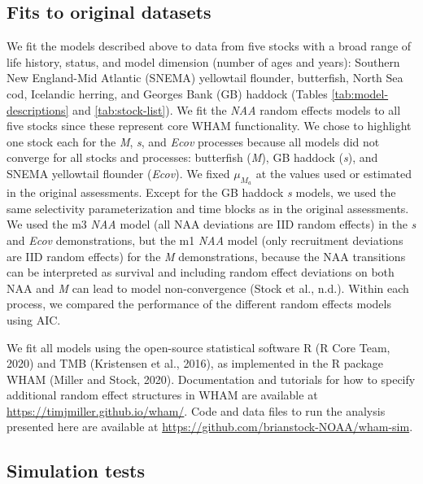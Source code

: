 \documentclass[]{article}
\begin{document}
\hypertarget{fits-to-original-datasets}{%
\subsection{Fits to original datasets}\label{fits-to-original-datasets}}

We fit the models described above to data from five stocks with a broad
range of life history, status, and model dimension (number of ages and
years): Southern New England-Mid Atlantic (SNEMA) yellowtail flounder,
butterfish, North Sea cod, Icelandic herring, and Georges Bank (GB)
haddock (Tables \ref{tab:model-descriptions} and \ref{tab:stock-list}).
We fit the \emph{NAA} random effects models to all five stocks since
these represent core WHAM functionality. We chose to highlight one stock
each for the \emph{M}, \emph{s}, and \emph{Ecov} processes because all
models did not converge for all stocks and processes: butterfish
(\emph{M}), GB haddock (\emph{s}), and SNEMA yellowtail flounder
(\emph{Ecov}). We fixed \(\mu_{M_a}\) at the values used or estimated in
the original assessments. Except for the GB haddock \emph{s} models, we
used the same selectivity parameterization and time blocks as in the
original assessments. We used the m3 \emph{NAA} model (all NAA
deviations are IID random effects) in the \emph{s} and \emph{Ecov}
demonstrations, but the m1 \emph{NAA} model (only recruitment deviations
are IID random effects) for the \emph{M} demonstrations, because the NAA
transitions can be interpreted as survival and including random effect
deviations on both NAA and \emph{M} can lead to model non-convergence
(Stock et al., n.d.). Within each process, we compared the performance
of the different random effects models using AIC.

We fit all models using the open-source statistical software R (R Core
Team, 2020) and TMB (Kristensen et al., 2016), as implemented in the R
package WHAM (Miller and Stock, 2020). Documentation and tutorials for
how to specify additional random effect structures in WHAM are available
at \url{https://timjmiller.github.io/wham/}. Code and data files to run
the analysis presented here are available at
\url{https://github.com/brianstock-NOAA/wham-sim}.

\hypertarget{simulation-tests}{%
\subsection{Simulation tests}\label{simulation-tests}}
\end{document}
